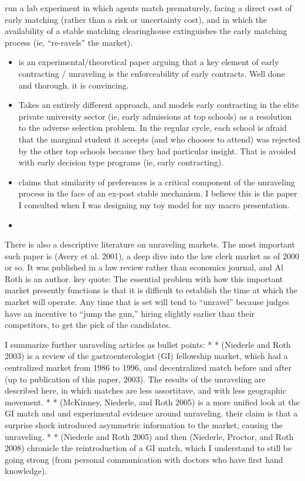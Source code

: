 \documentclass[AER]{AEA}
\begin{document}
\cite{Damiano2005} run a lab experiment in which agents match prematurely, facing a direct cost of early matching (rather than a risk or uncertainty cost), and in which the availability of a stable matching clearinghouse extinguishes the early matching process (ie, “re-ravels” the market).
\begin{itemize}
	\item \cite{Niederle2004} is an experimental/theoretical paper arguing that a key element of early contracting / unraveling is the enforceability of early contracts.  Well done and thorough, it is convincing.
	\item   \cite{Lee2009}Takes an entirely different approach, and models early contracting in the elite private university sector (ie, early admissions at top schools) as a resolution to the adverse selection problem.  In the regular cycle, each school is afraid that the marginal student it accepts (and who chooses to attend) was rejected by the other top schools because they had particular insight.  That is avoided with early decision type programs (ie, early contracting).
	\item  \cite{Halaburda2010} claims that similarity of preferences is a critical component of the unraveling process in the face of an ex-post stable mechanism.  I believe this is the paper I consulted when I was designing my toy model for my macro presentation.  
	\item 
\end{itemize}




There is also a descriptive literature on unraveling markets.  The most important such paper is (Avery et al. 2001), a deep dive into the law clerk market as of 2000 or so.  It was published in a law review rather than economics journal, and Al Roth is an author. key quote:
The essential problem with how this important market presently functions is that it is difficult to establish the time at which the market will operate. Any time that is set will tend to “unravel” because judges have an incentive to “jump the gun,” hiring slightly earlier than their competitors, to get the pick of the candidates.


I summarize further unraveling articles as bullet points:
* * (Niederle and Roth 2003) is a review of the gastroenterologist (GI) fellowship market, which had a centralized market from 1986 to 1996, and decentralized match before and after (up to publication of this paper, 2003).  The results of the unraveling are described here, in which matches are less assortitave, and with less geographic movement.
* * (McKinney, Niederle, and Roth 2005) is a more unified look at the GI match and and experimental evidence around unraveling.  their claim is that a surprise shock introduced asymmetric information to the market, causing the unraveling.  
* * (Niederle and Roth 2005) and then (Niederle, Proctor, and Roth 2008) chronicle the reintroduction of a GI match, which I understand to still be going strong (from personal communication with doctors who have first hand knowledge).
\end{document}

